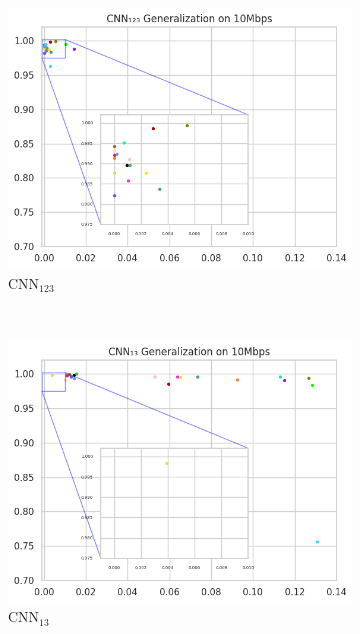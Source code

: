 \documentclass[a4paper,fleqn]{cas-sc}
\begin{document}
\begin{figure}[h!]
\begin{minipage}[t]{0.46\textwidth}
			\begin{subfigure}[t]{0.33\textwidth}
				\includegraphics[draft=false, width=\textwidth]{./figs/Generalizacao-CNN123-10Mbps.png} 
				\caption{CNN$_{123}$}
				\label{fig:Generalizacao-CNN123-10Mbps}
			\end{subfigure}%
			~
			\begin{subfigure}[t]{0.33\textwidth}
				\includegraphics[draft=false, width=\textwidth]{./figs/Generalizacao-CNN13-10Mbps.png} 
				\caption{CNN$_{13}$}
				\label{fig:Generalizacao-CNN13-10Mbps}
			\end{subfigure}%
			~
			\begin{subfigure}[t]{0.33\textwidth}

\end{subfigure}
\end{minipage}
\end{figure}
\end{document}
